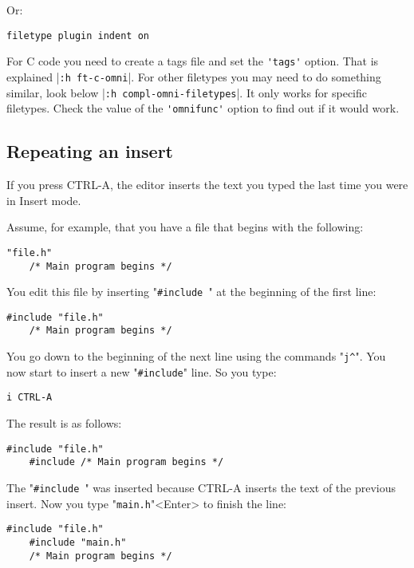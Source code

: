 Or:

\begin{Verbatim}[samepage=true]
 filetype plugin indent on
\end{Verbatim}

For C code you need to create a tags file and set the \verb!'tags'! option.
That is explained |\verb!:h ft-c-omni!|.
For other filetypes you may need to do something similar, look below |\verb!:h compl-omni-filetypes!|.
It only works for specific filetypes.
Check the value of the \verb!'omnifunc'! option to find out if it would work.
\subsection{Repeating an insert}
If you press CTRL-A, the editor inserts the text you typed the last time you were in Insert mode.

Assume, for example, that you have a file that begins with the following:

\begin{Verbatim}[samepage=true]
    "file.h" 
    /* Main program begins */ 
\end{Verbatim}

You edit this file by inserting "\verb!#include !" at the beginning of the first line:

\begin{Verbatim}[samepage=true]
    #include "file.h" 
    /* Main program begins */ 
\end{Verbatim}

You go down to the beginning of the next line using the commands "\verb!j^!".
You now start to insert a new "\verb!#include!" line.
So you type:

\begin{Verbatim}[samepage=true]
 i CTRL-A
\end{Verbatim}

The result is as follows:

\begin{Verbatim}[samepage=true]
    #include "file.h" 
    #include /* Main program begins */ 
\end{Verbatim}

The "\verb!#include !" was inserted because CTRL-A inserts the text of the previous insert.
Now you type  "\verb!main.h!"<Enter>  to finish the line:


\begin{Verbatim}[samepage=true]
    #include "file.h" 
    #include "main.h" 
    /* Main program begins */ 
\end{Verbatim}

